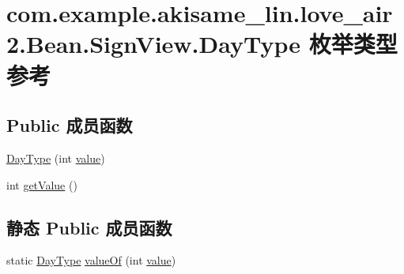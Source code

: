 \hypertarget{enumcom_1_1example_1_1akisame__lin_1_1love__air2_1_1_bean_1_1_sign_view_1_1_day_type}{}\section{com.\+example.\+akisame\+\_\+lin.\+love\+\_\+air2.\+Bean.\+Sign\+View.\+Day\+Type 枚举类型参考}
\label{enumcom_1_1example_1_1akisame__lin_1_1love__air2_1_1_bean_1_1_sign_view_1_1_day_type}
\subsection*{Public 成员函数}
\begin{DoxyCompactItemize}
\item 
\mbox{\hyperlink{enumcom_1_1example_1_1akisame__lin_1_1love__air2_1_1_bean_1_1_sign_view_1_1_day_type_a66cd9c2d8d17bc4f58a7a991a1a88430}{Day\+Type}} (int \mbox{\hyperlink{enumcom_1_1example_1_1akisame__lin_1_1love__air2_1_1_bean_1_1_sign_view_1_1_day_type_afd98f926ce9f154abfbd4dd8cb855806}{value}})
\item 
int \mbox{\hyperlink{enumcom_1_1example_1_1akisame__lin_1_1love__air2_1_1_bean_1_1_sign_view_1_1_day_type_af275898dae7c2b6be3bdc435b1ae30ea}{get\+Value}} ()
\end{DoxyCompactItemize}
\subsection*{静态 Public 成员函数}
\begin{DoxyCompactItemize}
\item 
static \mbox{\hyperlink{enumcom_1_1example_1_1akisame__lin_1_1love__air2_1_1_bean_1_1_sign_view_1_1_day_type}{Day\+Type}} \mbox{\hyperlink{enumcom_1_1example_1_1akisame__lin_1_1love__air2_1_1_bean_1_1_sign_view_1_1_day_type_a3f3a23822680bec17d598753ce0f6c10}{value\+Of}} (int \mbox{\hyperlink{enumcom_1_1example_1_1akisame__lin_1_1love__air2_1_1_bean_1_1_sign_view_1_1_day_type_afd98f926ce9f154abfbd4dd8cb855806}{value}})
\end{DoxyCompactItemize}
